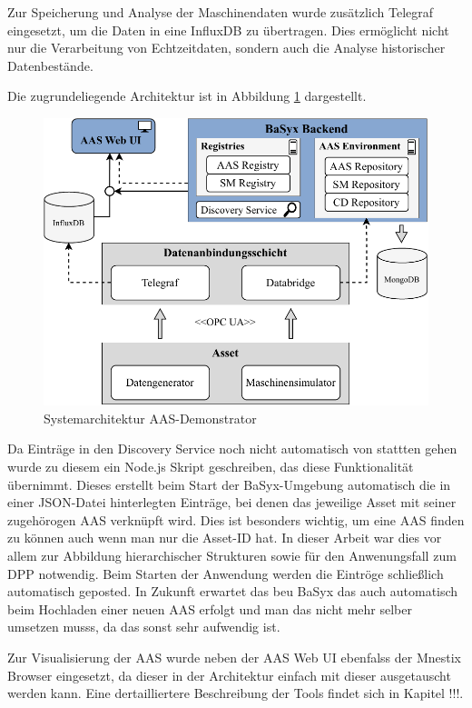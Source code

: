 Zur Speicherung und Analyse der Maschinendaten wurde zusätzlich Telegraf eingesetzt, um die Daten in eine InfluxDB zu übertragen. 
Dies ermöglicht nicht nur die Verarbeitung von Echtzeitdaten, sondern auch die Analyse historischer Datenbestände.

Die zugrundeliegende Architektur ist in Abbildung \ref{fig:Systemarchitektur} dargestellt.

\begin{figure}[htbp]
    \centering
        \includegraphics[width=1\textwidth]{Bilder/Ergebnisse/DynamischeDaten/Architektur.pdf}
    \caption{Systemarchitektur AAS-Demonstrator}
    \label{fig:Systemarchitektur}
\end{figure}

Da Einträge in den Discovery Service noch nicht automatisch von stattten gehen wurde zu diesem ein Node.js Skript geschreiben, das diese Funktionalität übernimmt.
Dieses erstellt beim Start der BaSyx-Umgebung automatisch die in einer JSON-Datei hinterlegten Einträge, bei denen das jeweilige Asset mit seiner zugehörogen AAS verknüpft wird.
Dies ist besonders wichtig, um eine AAS finden zu können auch wenn man nur die Asset-ID hat. In dieser Arbeit war dies vor allem zur Abbildung hierarchischer Strukturen sowie für den Anwenungsfall zum DPP notwendig.
Beim Starten der Anwendung werden die Eintröge schließlich automatisch geposted.
In Zukunft erwartet das beu BaSyx das auch automatisch beim Hochladen einer neuen AAS erfolgt und man das nicht mehr selber umsetzen musss, da das sonst sehr aufwendig ist.

Zur Visualisierung der AAS wurde neben der AAS Web UI ebenfalss der Mnestix Browser eingesetzt, da dieser in der Architektur einfach mit dieser ausgetauscht werden kann.
Eine dertailliertere Beschreibung der Tools findet sich in Kapitel !!!.


